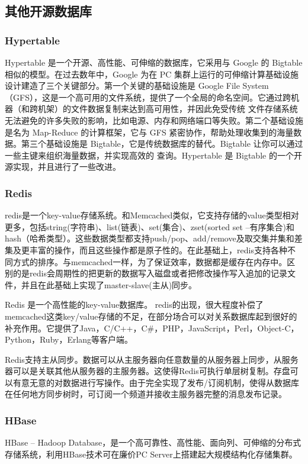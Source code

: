 \documentclass[11pt, a4paper, oneside]{ctexart}
\begin{document}
\subsection{其他开源数据库}
\subsubsection{Hypertable}
Hypertable 是一个开源、高性能、可伸缩的数据库，它采用与 Google 的 Bigtable 相似的模型。在过去数年中，Google 为在 PC 集群上运行的可伸缩计算基础设施设计建造了三个关键部分。第一个关键的基础设施是 Google File System（GFS），这是一个高可用的文件系统，提供了一个全局的命名空间。它通过跨机器（和跨机架）的文件数据复制来达到高可用性，并因此免受传统 文件存储系统无法避免的许多失败的影响，比如电源、内存和网络端口等失败。第二个基础设施是名为 Map-Reduce 的计算框架，它与 GFS 紧密协作，帮助处理收集到的海量数据。第三个基础设施是 Bigtable，它是传统数据库的替代。Bigtable 让你可以通过一些主键来组织海量数据，并实现高效的 查询。Hypertable 是 Bigtable 的一个开源实现，并且进行了一些改进。
\subsubsection{Redis}
redis是一个key-value存储系统。和Memcached类似，它支持存储的value类型相对更多，包括string(字符串)、list(链表)、set(集合)、zset(sorted set --有序集合)和hash（哈希类型）。这些数据类型都支持push/pop、add/remove及取交集并集和差集及更丰富的操作，而且这些操作都是原子性的。在此基础上，redis支持各种不同方式的排序。与memcached一样，为了保证效率，数据都是缓存在内存中。区别的是redis会周期性的把更新的数据写入磁盘或者把修改操作写入追加的记录文件，并且在此基础上实现了master-slave(主从)同步。

Redis 是一个高性能的key-value数据库。 redis的出现，很大程度补偿了memcached这类key/value存储的不足，在部分场合可以对关系数据库起到很好的补充作用。它提供了Java，C/C++，C\#，PHP，JavaScript，Perl，Object-C，Python，Ruby，Erlang等客户端。

Redis支持主从同步。数据可以从主服务器向任意数量的从服务器上同步，从服务器可以是关联其他从服务器的主服务器。这使得Redis可执行单层树复制。存盘可以有意无意的对数据进行写操作。由于完全实现了发布/订阅机制，使得从数据库在任何地方同步树时，可订阅一个频道并接收主服务器完整的消息发布记录。
\subsubsection{HBase}
HBase – Hadoop Database，是一个高可靠性、高性能、面向列、可伸缩的分布式存储系统，利用HBase技术可在廉价PC Server上搭建起大规模结构化存储集群。
\end{document}

